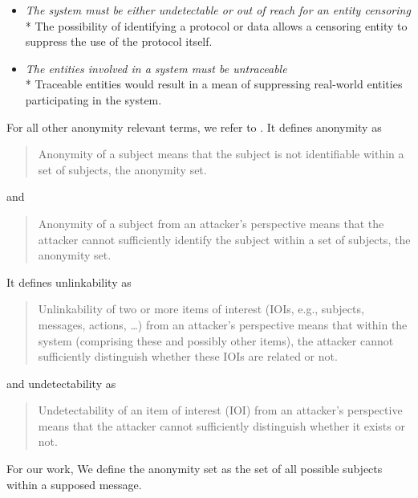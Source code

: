 \documentclass[10pt,journal,compsoc,twocolumn,twoside]{IEEEtran}
\begin{document}
\begin{itemize}
	\item \emph{The system must be either undetectable or out of reach for an entity censoring}\\*
	The possibility of identifying a protocol or data allows a censoring entity to suppress the use of the protocol itself. 
	\item \emph{The entities involved in a system must be untraceable}\\*
	Traceable entities would result in a mean of suppressing real-world entities participating in the system.
\end{itemize}

For all other anonymity relevant terms, we refer to \cite{anon_terminology}.
It defines anonymity as 

\begin{quote}
	Anonymity of a subject means that the subject is not identifiable within a set of subjects, the anonymity set.\omitted
\end{quote}
and
\begin{quote}
	Anonymity of a subject from an attacker's perspective means that the attacker cannot sufficiently identify the subject within a set of subjects, the anonymity set.\omitted
\end{quote}

\noindent It defines unlinkability as

\begin{quote}
	Unlinkability of two or more items of interest (IOIs, e.g., subjects, messages, actions, \ldots) from an attacker’s perspective means that within the system (comprising these and possibly other items), the attacker cannot sufficiently distinguish whether these IOIs are related or not.\omitted
\end{quote}

\noindent and undetectability as
\begin{quote}
	Undetectability of an item of interest (IOI) from an attacker’s perspective means that the attacker cannot sufficiently distinguish whether it exists or not.
\end{quote}

For our work, We define the anonymity set as the set of all possible subjects within a supposed message. %
\end{document}
